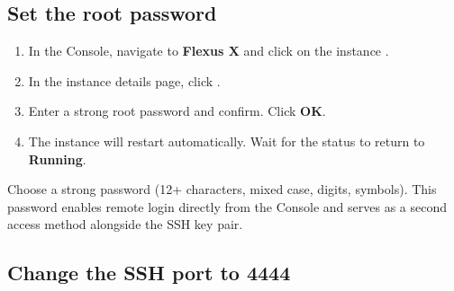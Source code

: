 \documentclass{guide}
\begin{document}
\subsection{Set the root password}


\stepbystep
\begin{enumerate}
  \item In the Console, navigate to \textbf{Flexus X} and click
        on the instance .
  \item In the instance details page, click .


  \item Enter a strong root password and confirm. Click \textbf{OK}.
  \item The instance will restart automatically. Wait for the status to return
        to \textbf{Running}.
\end{enumerate}

\begin{warning}
Choose a strong password (12+ characters, mixed case, digits, symbols).
This password enables remote login directly from the Console and serves as
a second access method alongside the SSH key pair.
\end{warning}

\subsection{Change the SSH port to 4444}

\end{document}
